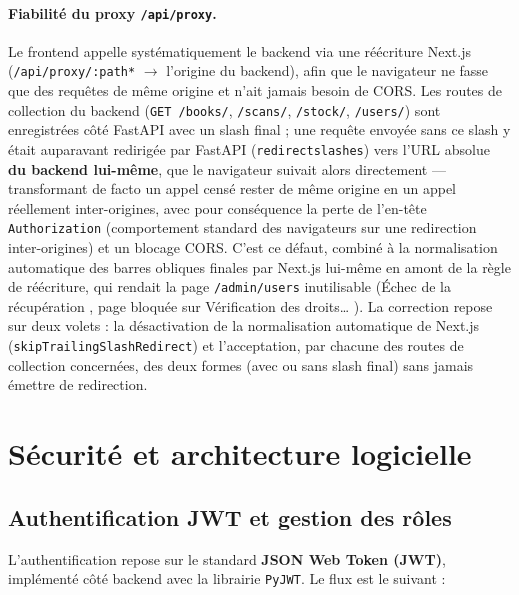 \documentclass[12pt, a4paper]{report}
\renewcommand{\_}{\origunderscore\allowbreak}
\begin{document}
\paragraph{Fiabilité du proxy \texttt{/api/proxy}.} Le frontend appelle systématiquement le backend via une réécriture Next.js (\texttt{/api/proxy/:path*} $\rightarrow$ l'origine du backend), afin que le navigateur ne fasse que des requêtes de même origine et n'ait jamais besoin de CORS. Les routes de collection du backend (\texttt{GET /books/}, \texttt{/scans/}, \texttt{/stock/}, \texttt{/users/}) sont enregistrées côté FastAPI avec un slash final ; une requête envoyée sans ce slash y était auparavant redirigée par FastAPI (\texttt{redirect\_slashes}) vers l'URL absolue \textbf{du backend lui-même}, que le navigateur suivait alors directement — transformant de facto un appel censé rester de même origine en un appel réellement inter-origines, avec pour conséquence la perte de l'en-tête \texttt{Authorization} (comportement standard des navigateurs sur une redirection inter-origines) et un blocage CORS. C'est ce défaut, combiné à la normalisation automatique des barres obliques finales par Next.js lui-même en amont de la règle de réécriture, qui rendait la page \texttt{/admin/users} inutilisable (\og Échec de la récupération \fg{}, page bloquée sur \og Vérification des droits… \fg{}). La correction repose sur deux volets : la désactivation de la normalisation automatique de Next.js (\texttt{skipTrailingSlashRedirect}) et l'acceptation, par chacune des routes de collection concernées, des deux formes (avec ou sans slash final) sans jamais émettre de redirection.

\section{Sécurité et architecture logicielle}

\subsection{Authentification JWT et gestion des rôles}

L'authentification repose sur le standard \textbf{JSON Web Token (JWT)}, implémenté côté backend avec la librairie \texttt{PyJWT}. Le flux est le suivant :
\end{document}
